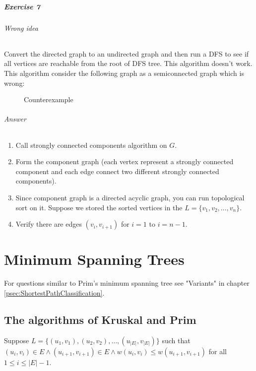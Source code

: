 \documentclass{book}
\begin{document}
	\paragraph{Exercise 7}
	
	\subparagraph{Wrong idea} Convert the directed graph to an undirected graph and then run a DFS to see if all vertices are reachable from the root of DFS tree. This algorithm doesn't work. This algorithm consider the following graph as a semiconnected graph which is wrong:	
	
	\begin{figure}[h!]
		\centering
		\caption{Counterexample}
					\end{figure}	
	
	\FloatBarrier
	
	\subparagraph{Answer}
	\begin{enumerate}
	\item Call strongly connected components algorithm on $G$.
	\item Form the component graph (each vertex represent a strongly connected component and each edge connect two different strongly connected components).
	\item Since component graph is a directed acyclic graph, you can run topological sort on it. Suppose we stored the sorted vertices in the $L = \{v_1, v_2, \dots, v_n\}$.
	\item Verify there are edges $(v_i, v_{i+1})$ for $i = 1$ to $i = n - 1$.
	\end{enumerate}
	
	\chapter{Minimum Spanning Trees}
	For questions similar to Prim's minimum spanning tree see "Variants" in chapter \ref{psec:ShortestPathClassification}.
	\section{The algorithms of Kruskal and Prim}
	Suppose $L = \{(u_1, v_1), (u_2, v_2), \dots, (u_{|E|}, v_{|E|})\}$ such that $(u_i, v_i) \in E \land (u_{i + 1}, v_{i + 1}) \in E \land w(u_i, v_i) \le w(u_{i + 1}, v_{i + 1})$ for all $1 \le i \le |E| - 1$.
	
\end{document}
